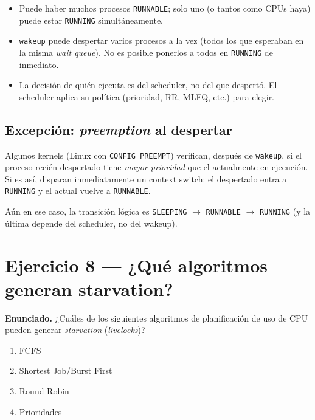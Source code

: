 \documentclass[11pt,a4paper]{article}
\begin{document}
\begin{itemize}[leftmargin=*]
    \item Puede haber muchos procesos \texttt{RUNNABLE}; solo uno
        (o tantos como CPUs haya) puede estar \texttt{RUNNING}
        simultáneamente.
    \item \texttt{wakeup} puede despertar varios procesos a la vez
        (todos los que esperaban en la misma \emph{wait queue}).
        No es posible ponerlos a todos en \texttt{RUNNING} de
        inmediato.
    \item La decisión de quién ejecuta es del scheduler, no del
        que despertó. El scheduler aplica su política (prioridad,
        RR, MLFQ, etc.) para elegir.
\end{itemize}

\subsection*{Excepción: \emph{preemption} al despertar}

Algunos kernels (Linux con \texttt{CONFIG\_PREEMPT}) verifican,
después de \texttt{wakeup}, si el proceso recién despertado tiene
\emph{mayor prioridad} que el actualmente en ejecución. Si es así,
disparan inmediatamente un context switch: el despertado entra a
\texttt{RUNNING} y el actual vuelve a \texttt{RUNNABLE}.

Aún en ese caso, la transición lógica es
\texttt{SLEEPING} $\to$ \texttt{RUNNABLE} $\to$ \texttt{RUNNING} (y
la última depende del scheduler, no del wakeup).

\section{Ejercicio 8 --- ¿Qué algoritmos generan starvation?}

\textbf{Enunciado.} ¿Cuáles de los siguientes algoritmos de
planificación de uso de CPU pueden generar \emph{starvation}
(\emph{livelocks})?

\begin{enumerate}[leftmargin=*,nosep,label=\alph*)]
    \item FCFS
    \item Shortest Job/Burst First
    \item Round Robin
    \item Prioridades
\end{enumerate}
\end{document}
